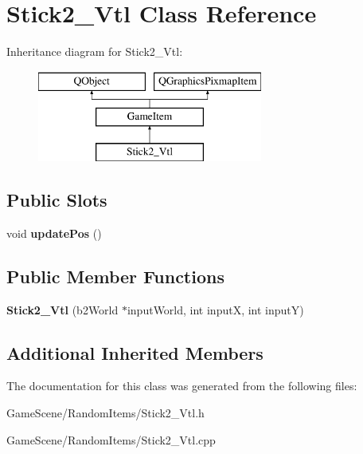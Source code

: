 \hypertarget{classStick2__Vtl}{}\section{Stick2\+\_\+\+Vtl Class Reference}
\label{classStick2__Vtl}
Inheritance diagram for Stick2\+\_\+\+Vtl\+:\begin{figure}[H]
\begin{center}
\leavevmode
\includegraphics[height=3.000000cm]{classStick2__Vtl}
\end{center}
\end{figure}
\subsection*{Public Slots}
\begin{DoxyCompactItemize}
\item 
void {\bfseries update\+Pos} ()\hypertarget{classStick2__Vtl_ad9a849d2a3165de4a50f97fea13a570f}{}\label{classStick2__Vtl_ad9a849d2a3165de4a50f97fea13a570f}

\end{DoxyCompactItemize}
\subsection*{Public Member Functions}
\begin{DoxyCompactItemize}
\item 
{\bfseries Stick2\+\_\+\+Vtl} (b2\+World $\ast$input\+World, int inputX, int inputY)\hypertarget{classStick2__Vtl_a5487f43f916a017dde98cb8d93071291}{}\label{classStick2__Vtl_a5487f43f916a017dde98cb8d93071291}

\end{DoxyCompactItemize}
\subsection*{Additional Inherited Members}


The documentation for this class was generated from the following files\+:\begin{DoxyCompactItemize}
\item 
Game\+Scene/\+Random\+Items/Stick2\+\_\+\+Vtl.\+h\item 
Game\+Scene/\+Random\+Items/Stick2\+\_\+\+Vtl.\+cpp\end{DoxyCompactItemize}
